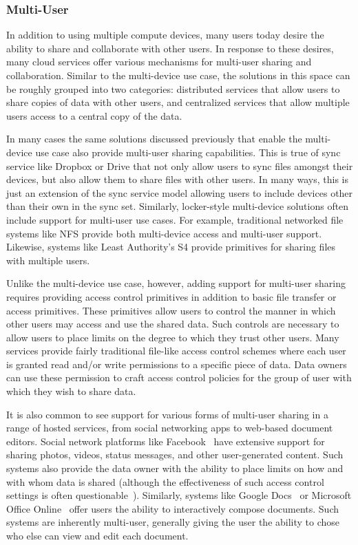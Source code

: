\subsubsection{Multi-User}

In addition to using multiple compute devices, many users today desire
the ability to share and collaborate with other users. In response to
these desires, many cloud services offer various mechanisms for
multi-user sharing and collaboration. Similar to the multi-device use
case, the solutions in this space can be roughly grouped into two
categories: distributed services that allow users to share copies of
data with other users, and centralized services that allow multiple
users access to a central copy of the data.

In many cases the same solutions discussed previously that enable the
multi-device use case also provide multi-user sharing
capabilities. This is true of sync service like Dropbox or Drive that
not only allow users to sync files amongst their devices, but also
allow them to share files with other users. In many ways, this is just
an extension of the sync service model allowing users to include
devices other than their own in the sync set. Similarly, locker-style
multi-device solutions often include support for multi-user use
cases. For example, traditional networked file systems like NFS
provide both multi-device access and multi-user support. Likewise,
systems like Least Authority's S4 provide primitives for sharing files
with multiple users.

Unlike the multi-device use case, however, adding support for
multi-user sharing requires providing access control primitives in
addition to basic file transfer or access primitives. These primitives
allow users to control the manner in which other users may access and
use the shared data. Such controls are necessary to allow users to
place limits on the degree to which they trust other users. Many
services provide fairly traditional file-like access control schemes
where each user is granted read and/or write permissions to a specific
piece of data. Data owners can use these permission to craft access
control policies for the group of user with which they wish to share
data.

It is also common to see support for various forms of multi-user
sharing in a range of hosted services, from social networking apps to
web-based document editors. Social network platforms like
Facebook~\cite{facebook} have extensive support for sharing photos,
videos, status messages, and other user-generated content. Such
systems also provide the data owner with the ability to place limits
on how and with whom data is shared (although the effectiveness of
such access control settings is often
questionable~\cite{johnson2012}). Similarly, systems like Google
Docs~\cite{google-docs} or Microsoft Office
Online~\cite{microsoft-officeonline} offer users the ability to
interactively compose documents. Such systems are inherently
multi-user, generally giving the user the ability to chose who else
can view and edit each document.

